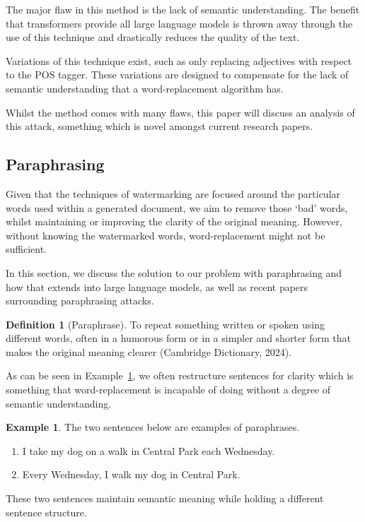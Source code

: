 \documentclass{l4proj}
\theoremstyle{definition}
\newtheorem{definition}{Definition}[section]
\newtheorem{example}{Example}[section]
\begin{document}
        The major flaw in this method is the lack of semantic understanding. The benefit that transformers provide all large language models is thrown away through the use of this technique and drastically reduces the quality of the text.
        
        Variations of this technique exist, such as only replacing adjectives with respect to the POS tagger. These variations are designed to compensate for the lack of semantic understanding that a word-replacement algorithm has.

        Whilst the method comes with many flaws, this paper will discuss an analysis of this attack, something which is novel amongst current research papers.
    
    \subsection{Paraphrasing}
        Given that the techniques of watermarking are focused around the particular words used within a generated document, we aim to remove those `bad' words, whilst maintaining or improving the clarity of the original meaning. However, without knowing the watermarked words, word-replacement might not be sufficient. 

        In this section, we discuss the solution to our problem with paraphrasing and how that extends into large language models, as well as recent papers surrounding paraphrasing attacks.

        \begin{definition}[Paraphrase]
            \label{def:paraphrase}
            To repeat something written or spoken using different words, often in a humorous form or in a simpler and shorter form that makes the original meaning clearer (Cambridge Dictionary, 2024). %
        \end{definition}

        As can be seen in Example~\ref{example:paraphrase}, we often restructure sentences for clarity which is something that word-replacement is incapable of doing without a degree of semantic understanding.

        \begin{example}
            \label{example:paraphrase}
            The two sentences below are examples of paraphrases.
            \begin{enumerate}[label=(\alph*)]
                \item I take my dog on a walk in Central Park each Wednesday. 
                \item Every Wednesday, I walk my dog in Central Park.
            \end{enumerate}
            These two sentences maintain semantic meaning while holding a different sentence structure. 
        \end{example}
\end{document}

